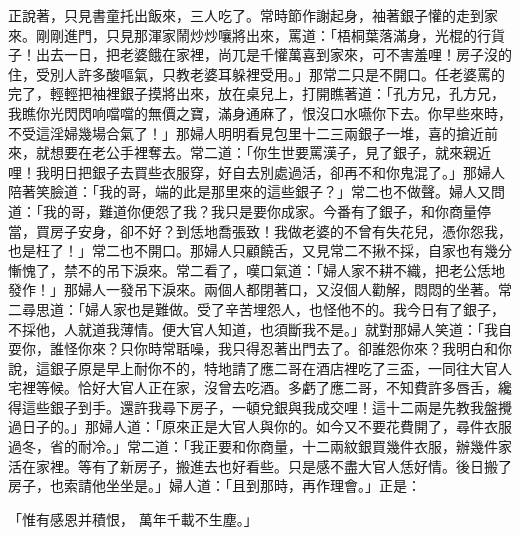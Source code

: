 正說著，只見書童托出飯來，三人吃了。常時節作謝起身，袖著銀子懽的走到家來。剛剛進門，只見那渾家鬧炒炒嚷將出來，罵道：「梧桐葉落滿身，光棍的行貨子！出去一日，把老婆餓在家裡，尚兀是千懽萬喜到家來，可不害羞哩！房子沒的住，受別人許多酸嘔氣，只教老婆耳躲裡受用。」那常二只是不開口。任老婆罵的完了，輕輕把袖裡銀子摸將出來，放在桌兒上，打開瞧著道：「孔方兄，孔方兄，我瞧你光閃閃响噹噹的無價之寶，滿身通麻了，恨沒口水嚥你下去。你早些來時，不受這淫婦幾場合氣了！」那婦人明明看見包里十二三兩銀子一堆，喜的搶近前來，就想要在老公手裡奪去。常二道：「你生世要罵漢子，見了銀子，就來親近哩！我明日把銀子去買些衣服穿，好自去別處過活，卻再不和你鬼混了。」那婦人陪著笑臉道：「我的哥，端的此是那里來的這些銀子？」常二也不做聲。婦人又問道：「我的哥，難道你便怨了我？我只是要你成家。今番有了銀子，和你商量停當，買房子安身，卻不好？到恁地喬張致！我做老婆的不曾有失花兒，憑你怨我，也是枉了！」常二也不開口。那婦人只顧饒舌，又見常二不揪不採，自家也有幾分慚愧了，禁不的吊下淚來。常二看了，嘆口氣道：「婦人家不耕不織，把老公恁地發作！」那婦人一發吊下淚來。兩個人都閉著口，又沒個人勸解，悶悶的坐著。常二尋思道：「婦人家也是難做。受了辛苦埋怨人，也怪他不的。我今日有了銀子，不採他，人就道我薄情。便大官人知道，也須斷我不是。」就對那婦人笑道：「我自耍你，誰怪你來？只你時常聒噪，我只得忍著出門去了。卻誰怨你來？我明白和你說，這銀子原是早上耐你不的，特地請了應二哥在酒店裡吃了三盃，一同往大官人宅裡等候。恰好大官人正在家，沒曾去吃酒。多虧了應二哥，不知費許多唇舌，纔得這些銀子到手。還許我尋下房子，一頓兌銀與我成交哩！這十二兩是先教我盤攪過日子的。」那婦人道：「原來正是大官人與你的。如今又不要花費開了，尋件衣服過冬，省的耐冷。」常二道：「我正要和你商量，十二兩紋銀買幾件衣服，辦幾件家活在家裡。等有了新房子，搬進去也好看些。只是感不盡大官人恁好情。後日搬了房子，也索請他坐坐是。」婦人道：「且到那時，再作理會。」正是：

「惟有感恩并積恨，  萬年千載不生塵。」

